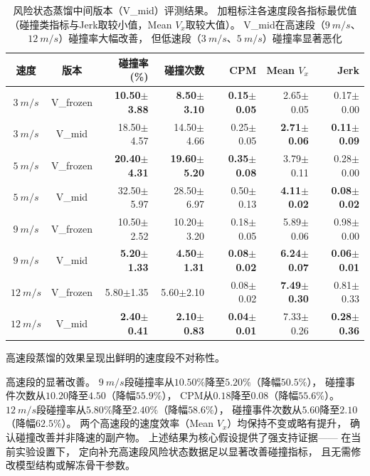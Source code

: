 \begin{table}[!htbp]
\centering
\caption{风险状态蒸馏中间版本（V\_mid）评测结果。
加粗标注各速度段各指标最优值（碰撞类指标与Jerk取较小值，Mean $V_x$取较大值）。
V\_mid在高速段（$\SI{9}{m/s}$、$\SI{12}{m/s}$）碰撞率大幅改善，
但低速段（$\SI{3}{m/s}$、$\SI{5}{m/s}$）碰撞率显著恶化}
\label{tab:ch5_riskset_mid}
\begin{tabular}{ccrrrrr}
\toprule
\textbf{速度} & \textbf{版本} & \textbf{碰撞率 (\%)} & \textbf{碰撞次数} & \textbf{CPM} & \textbf{Mean $V_x$} & \textbf{Jerk} \\
\midrule
$\SI{3}{m/s}$  & V\_frozen & \textbf{10.50$\pm$3.88} & \textbf{8.50$\pm$3.10} & \textbf{0.15$\pm$0.05} & 2.65$\pm$0.05 & 0.17$\pm$0.00 \\
$\SI{3}{m/s}$  & V\_mid    & 18.50$\pm$4.57 & 14.50$\pm$4.66 & 0.25$\pm$0.05 & \textbf{2.71$\pm$0.06} & \textbf{0.11$\pm$0.09} \\
\midrule
$\SI{5}{m/s}$  & V\_frozen & \textbf{20.40$\pm$4.31} & \textbf{19.60$\pm$5.20} & \textbf{0.35$\pm$0.08} & 3.79$\pm$0.11 & 0.28$\pm$0.00 \\
$\SI{5}{m/s}$  & V\_mid    & 32.50$\pm$5.97 & 28.50$\pm$6.97 & 0.50$\pm$0.13 & \textbf{4.11$\pm$0.02} & \textbf{0.08$\pm$0.02} \\
\midrule
$\SI{9}{m/s}$  & V\_frozen & 10.50$\pm$2.52 & 10.20$\pm$3.20 & 0.18$\pm$0.05 & 5.89$\pm$0.06 & 0.98$\pm$0.00 \\
$\SI{9}{m/s}$  & V\_mid    & \textbf{5.20$\pm$1.33}  & \textbf{4.50$\pm$1.31} & \textbf{0.08$\pm$0.02} & \textbf{6.24$\pm$0.07} & \textbf{0.06$\pm$0.01} \\
\midrule
$\SI{12}{m/s}$ & V\_frozen & 5.80$\pm$1.35  & 5.60$\pm$2.10 & 0.08$\pm$0.02 & \textbf{7.49$\pm$0.30} & 0.81$\pm$0.33 \\
$\SI{12}{m/s}$ & V\_mid    & \textbf{2.40$\pm$0.41}  & \textbf{2.10$\pm$0.83} & \textbf{0.04$\pm$0.01} & 7.33$\pm$0.26 & \textbf{0.28$\pm$0.36} \\
\bottomrule
\end{tabular}
\end{table}
\FloatBarrier

高速段蒸馏的效果呈现出鲜明的速度段不对称性。

高速段的显著改善。
$\SI{9}{m/s}$段碰撞率从$10.50\%$降至$5.20\%$（降幅$50.5\%$），
碰撞事件次数从$10.20$降至$4.50$（降幅$55.9\%$），
CPM从$0.18$降至$0.08$（降幅$55.6\%$）。
$\SI{12}{m/s}$段碰撞率从$5.80\%$降至$2.40\%$（降幅$58.6\%$），
碰撞事件次数从$5.60$降至$2.10$（降幅$62.5\%$）。
两个高速段的速度效率（Mean $V_x$）均保持不变或略有提升，
确认碰撞改善并非降速的副产物。
上述结果为核心假设提供了强支持证据——
在当前实验设置下，
定向补充高速段风险状态数据足以显著改善碰撞指标，
且无需修改模型结构或解冻骨干参数。

